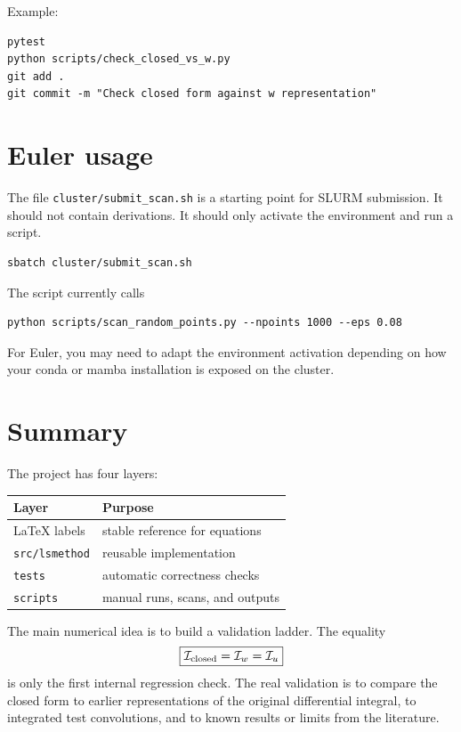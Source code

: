 \documentclass[11pt,a4paper]{article}
\begin{document}
Example:
\begin{lstlisting}
pytest
python scripts/check_closed_vs_w.py
git add .
git commit -m "Check closed form against w representation"
\end{lstlisting}

\section{Euler usage}

The file \texttt{cluster/submit\_scan.sh} is a starting point for SLURM submission. It should not contain derivations. It should only activate the environment and run a script.

\begin{lstlisting}
sbatch cluster/submit_scan.sh
\end{lstlisting}

The script currently calls
\begin{lstlisting}
python scripts/scan_random_points.py --npoints 1000 --eps 0.08
\end{lstlisting}
For Euler, you may need to adapt the environment activation depending on how your conda or mamba installation is exposed on the cluster.

\section{Summary}

The project has four layers:
\begin{center}
\begin{tabular}{ll}
\toprule
Layer & Purpose \\
\midrule
LaTeX labels & stable reference for equations \\
\texttt{src/lsmethod} & reusable implementation \\
\texttt{tests} & automatic correctness checks \\
\texttt{scripts} & manual runs, scans, and outputs \\
\bottomrule
\end{tabular}
\end{center}

The main numerical idea is to build a validation ladder. The equality
\begin{equation}
  \boxed{\mathcal I_{\rm closed}=\mathcal I_w=\mathcal I_u}
\end{equation}
is only the first internal regression check. The real validation is to compare the closed form to earlier representations of the original differential integral, to integrated test convolutions, and to known results or limits from the literature.
\end{document}

